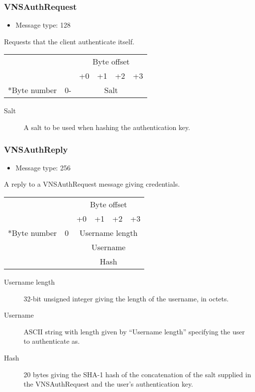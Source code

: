 \documentclass[a4paper,12pt]{report}
\begin{document}
\subsubsection{VNSAuthRequest}
\begin{itemize}
\item Message type: 128
\end{itemize}
Requests that the client authenticate itself.
\begin{center}
\begin{tabular}{r r | c | c | c | c |}
 & & \multicolumn{4}{c}{Byte offset} \\
 & & +0 & +1 & +2 & +3 \\
\hhline{~-----}
\multirow{1}*{Byte number} & 0- & \multicolumn{4}{c|}{Salt} \\
\end{tabular}
\end{center}
\begin{description}
\item[Salt]  A salt to be used when hashing the authentication key.
\end{description}


\subsubsection{VNSAuthReply}
\begin{itemize}
\item Message type: 256
\end{itemize}
A reply to a VNSAuthRequest message giving credentials.
\begin{center}
\begin{tabular}{r r | c | c | c | c |}
 & & \multicolumn{4}{c}{Byte offset} \\
 & & +0 & +1 & +2 & +3 \\
\hhline{~-----}
\multirow{3}*{Byte number} & 0 & \multicolumn{4}{c|}{Username length} \\
\hhline{~~----}
 & & \multicolumn{4}{c|}{Username} \\
\hhline{~~----}
 & & \multicolumn{4}{c|}{Hash} \\
\end{tabular}
\end{center}
\begin{description}
\item[Username length]  32-bit unsigned integer giving the length of the username, in octets.
\item[Username]  ASCII string with length given by ``Username length'' specifying the user to authenticate as.
\item[Hash]  20 bytes giving the SHA-1 hash of the concatenation of the salt supplied in the VNSAuthRequest and the user's authentication key.
\end{description}
\end{document}
